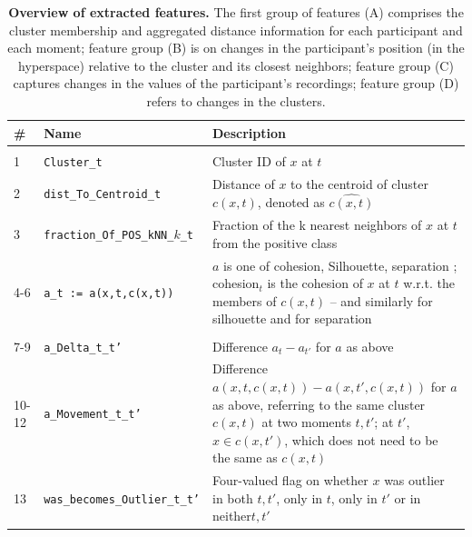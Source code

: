 \documentclass[
  oneside]{book}
\begin{document}
\begin{table}

\caption{\label{tab:06-tab-evo-features}\textbf{Overview of extracted features.} The first group of features (A) comprises the cluster membership and aggregated distance information for each participant and each moment; feature group (B) is on changes in the participant's position (in the hyperspace) relative to the cluster and its closest neighbors; feature group (C) captures changes in the values of the participant's recordings; feature group (D) refers to changes in the clusters.}
\centering
\begin{tabular}[t]{llp{8.5cm}}
\toprule
\textbf{\#} & \textbf{Name} & \textbf{Description}\\
\midrule
\addlinespace[0.3em]
\multicolumn{3}{l}{\textbf{(A) Features for participant $x$ at each moment}}\\
\hspace{1em}1 & \texttt{Cluster\_t} & Cluster ID of $x$ at $t$\\
\hspace{1em}2 & \texttt{dist\_To\_Centroid\_t} & Distance of $x$ to the centroid of cluster $c(x,t)$, denoted as $\widehat{c(x,t)}$\\
\hspace{1em}3 & \texttt{fraction\_Of\_POS\_kNN\_}$k$\texttt{\_t} & Fraction of the k nearest neighbors of $x$ at $t$ from the positive class\\
\hspace{1em}4-6 & \texttt{a\_t := a(x,t,c(x,t))} & $a$ is one of {cohesion, Silhouette, separation} \cite{TanDMbook}; cohesion$_t$ is the cohesion of $x$ at $t$ w.r.t. the members of $c(x,t)$ -- and similarly for silhouette and for separation\\
\addlinespace[0.3em]
\multicolumn{3}{l}{\textbf{(B) Evolution features linked to each participant $x$}}\\
\hspace{1em}7-9 & \texttt{a\_Delta\_t\_t'} & Difference $a_{t} - a_{t'}$ for $a$ as above\\
\hspace{1em}10-12 & \texttt{a\_Movement\_t\_t'} & Difference $a(x,t,c(x,t)) - a(x,t',c(x,t))$ for $a$ as above, referring to the same cluster $c(x,t)$ at two moments $t,t'$; at $t'$, $x\in{}c(x,t')$, which does not need to be the same as $c(x,t)$\\
\hspace{1em}13 & \texttt{was\_becomes\_Outlier\_t\_t'} & Four-valued flag on whether $x$ was outlier in both $t, t'$, only in $t$, only in $t'$ or in neither$t, t'$\\

\end{tabular}
\end{table}
\end{document}
